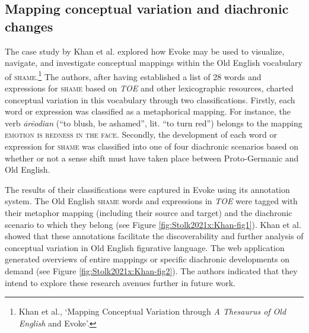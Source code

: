 \subsection{Mapping conceptual variation and diachronic changes}

The case study by Khan et al. explored how Evoke may be used to visualize, navigate, and investigate conceptual mappings within the Old English vocabulary of \textsc{shame}.\footnote{Khan et al., `Mapping Conceptual Variation through \textit{A Thesaurus of Old English} and Evoke'.} %
The authors, after having established a list of 28 words and expressions for \textsc{shame} based on \textit{TOE} and other lexicographic resources, charted conceptual variation in this vocabulary through two classifications. Firstly, each word or expression was classified as a metaphorical mapping. For instance, the verb \textit{ārēodian} (``to blush, be ashamed'', lit. ``to turn red'') belongs to the mapping \textsc{emotion is redness in the face}. Secondly, the development of each word or expression for \textsc{shame} was classified into one of four diachronic scenarios based on whether or not a sense shift must have taken place between Proto-Germanic and Old English.

The results of their classifications were captured in Evoke using its annotation system. The Old English \textsc{shame} words and expressions in \textit{TOE} were tagged with their metaphor mapping (including their source and target) and the diachronic scenario to which they belong (see Figure \ref{fig:Stolk2021x:Khan-fig1}). Khan et al. showed that these annotations facilitate the discoverability and further analysis of conceptual variation in Old English figurative language. The web application generated overviews of entire mappings or specific diachronic developments on demand (see Figure \ref{fig:Stolk2021x:Khan-fig2}). The authors indicated that they intend to explore these research avenues further in future work.

